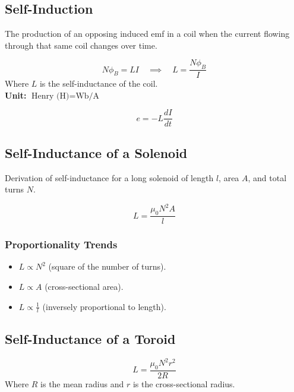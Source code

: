 \documentclass[11pt,a4paper]{article}
\begin{document}
\subsection{Self-Induction}
The production of an opposing induced emf in a coil when the current flowing through that same coil changes over time.
\begin{formulabox}
    \[ N\phi_B = L I \quad \implies \quad L = \frac{N\phi_B}{I} \]
    Where $L$ is the self-inductance of the coil. \\
    \textbf{Unit:} $\text{Henry (H)} = \text{Wb/A}$
\end{formulabox}

\begin{formulabox}
    \[ e = -L\frac{dI}{dt} \]
\end{formulabox}

\subsection{Self-Inductance of a Solenoid}
\begin{pyqbox}
    Derivation of self-inductance for a long solenoid of length $l$, area $A$, and total turns $N$.
\end{pyqbox}

\begin{formulabox}
    \[ L = \frac{\mu_0 N^2 A}{l} \]
\end{formulabox}

\subsubsection{Proportionality Trends}
\begin{itemize}
    \item $L \propto N^2$ (square of the number of turns).
    \item $L \propto A$ (cross-sectional area).
    \item $L \propto \frac{1}{l}$ (inversely proportional to length).
\end{itemize}

\subsection{Self-Inductance of a Toroid}
\begin{formulabox}
    \[ L = \frac{\mu_0 N^2 r^2}{2R} \]
    Where $R$ is the mean radius and $r$ is the cross-sectional radius.
\end{formulabox}
\end{document}
